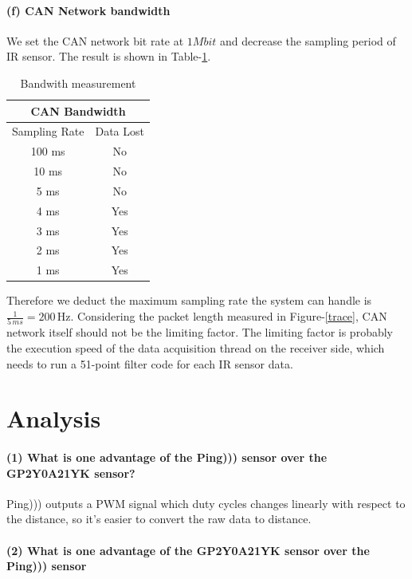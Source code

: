 \documentclass[a4paper]{article}
\begin{document}
\paragraph{(f) CAN Network bandwidth} We set the CAN network bit rate at $ 1 Mbit $ and decrease the sampling period of
IR sensor. The result is shown in Table-\ref{tab4}.

\begin{table}
\center
  \begin{tabular}{|c|c|}
    \hline
    \multicolumn{2}{|c|}{CAN Bandwidth} \\
    \hline
    Sampling Rate  & Data Lost \\
    \hline
	100 ms &   No \\
	10 ms  &   No \\
	5 ms   &   No \\
	4 ms   &   Yes \\
	3 ms   &   Yes \\
	2 ms   &   Yes \\
	1 ms   &   Yes \\
    \hline
  \end{tabular}
  \caption{Bandwith measurement}
  \label{tab4}
\end{table}

Therefore we deduct the maximum sampling rate the system can handle is $\frac{1}{5 \, ms} = 200 \, \text{Hz}$.
Considering the packet length measured in Figure-\ref{trace}, CAN network itself should not be the limiting factor.
The limiting factor is probably the execution speed of the data acquisition thread on the receiver side, which
needs to run a 51-point filter code for each IR sensor data.

\section{Analysis}

\paragraph{(1) What is one advantage of the Ping))) sensor over the GP2Y0A21YK sensor? \\ }

Ping))) outputs a PWM signal which duty cycles changes linearly with respect to the distance, so it's easier to convert the raw data to distance.

\paragraph{(2) What is one advantage of the \textbf{GP2Y0A21YK} sensor over the Ping))) sensor \\ }
\end{document}
